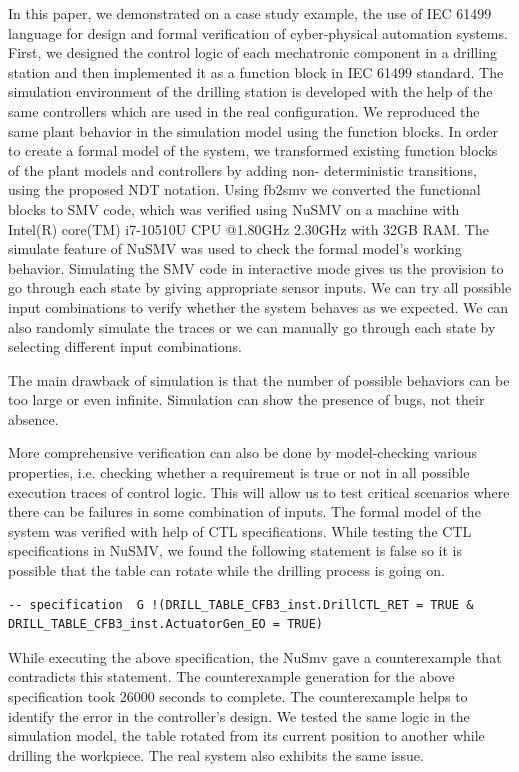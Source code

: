 \begin{bibunit}
In this paper, we demonstrated on a case study example, the use of IEC 61499 language for design and formal verification of cyber-physical automation systems. First, we designed the control logic of each mechatronic component in a drilling station and then implemented it as a function block in IEC 61499 standard. The simulation environment of the drilling station is developed with the help of the same controllers which are used in the real configuration. We reproduced the same plant behavior in the simulation model using the function blocks. In order to create a formal model of the system, we transformed existing function blocks of the plant models and controllers by adding non- deterministic transitions, using the proposed NDT notation. Using fb2smv  we converted the functional blocks to SMV code, which was verified using NuSMV on a machine with  Intel(R) core(TM) i7-10510U CPU @1.80GHz 2.30GHz  with 32GB RAM. The simulate feature of NuSMV was used to check the formal model's working behavior. Simulating the SMV code in interactive mode gives us the provision to go through each state by giving appropriate sensor inputs. We can try all possible input combinations to verify whether the system behaves as we expected. We can also randomly simulate the traces or we can manually go through each state by selecting different input combinations.

The main drawback of simulation is that the number of possible behaviors can be too large or even infinite. Simulation can show the presence of bugs, not their absence. 

More comprehensive verification can also be done by model-checking various properties, i.e. checking  whether a requirement  is true or not in all possible execution traces of control logic. This will allow us to test critical scenarios where there can be failures in some combination of inputs. The formal model of the system was verified with help of CTL \cite{emerson1985decision} specifications. While testing the CTL specifications in NuSMV, we found the following statement is false so it is possible that the table can rotate while the drilling process is going on.

\begin{lstlisting}[breaklines,basicstyle=\small]
-- specification  G !(DRILL_TABLE_CFB3_inst.DrillCTL_RET = TRUE & DRILL_TABLE_CFB3_inst.ActuatorGen_EO = TRUE)  
\end{lstlisting}

While executing the above specification, the NuSmv gave a counterexample that contradicts this statement. The counterexample generation for the above specification took 26000 seconds to complete. The counterexample helps to identify the error in the controller's design. We tested the same logic in the simulation model, the table rotated from its current position to another while drilling the workpiece. The real system also exhibits the same issue.


\end{bibunit}
